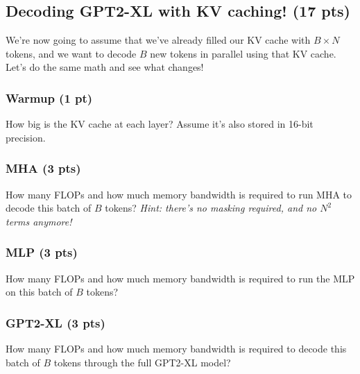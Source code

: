 \subsection{Decoding GPT2-XL with KV caching! (17 pts)}

We're now going to assume that we've already filled our KV cache with $B \times N$ tokens, and we want to decode $B$ new tokens in parallel using that KV cache. Let's do the same math and see what changes!

\subsubsection{Warmup (1 pt)}

How big is the KV cache at each layer? Assume it's also stored in 16-bit precision.

\begin{answer}

\end{answer}

\subsubsection{MHA (3 pts)}

How many FLOPs and how much memory bandwidth is required to run MHA to decode this batch of $B$ tokens?
\textit{Hint: there's no masking required, and no $N^2$ terms anymore!}

\begin{answer}
   
\end{answer}

\subsubsection{MLP (3 pts)}

How many FLOPs and how much memory bandwidth is required to run the MLP on this batch of $B$ tokens?

\begin{answer}

\end{answer}

\subsubsection{GPT2-XL (3 pts)}

How many FLOPs and how much memory bandwidth is required to decode this batch of $B$ tokens through the full GPT2-XL model?


